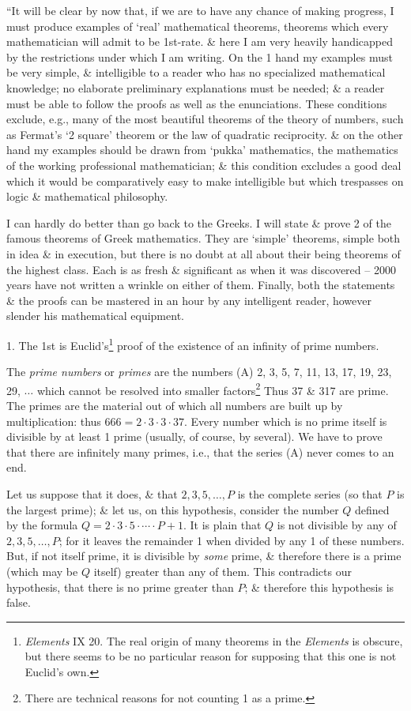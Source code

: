 \documentclass{article}
\numberwithin{equation}{section}
\begin{document}
 ``It will be clear by now that, if we are to have any chance of making progress, I must produce examples of `real' mathematical theorems, theorems which every mathematician will admit to be 1st-rate. \& here I am very heavily handicapped by the restrictions under which I am writing. On the 1 hand my examples must be very simple, \& intelligible to a reader who has no specialized mathematical knowledge; no elaborate preliminary explanations must be needed; \& a reader must be able to follow the proofs as well as the enunciations. These conditions exclude, e.g., many of the most beautiful theorems of the theory of numbers, such as Fermat's `2 square' theorem or the law of quadratic reciprocity. \& on the other hand my examples should be drawn from `pukka' mathematics, the mathematics of the working professional mathematician; \& this condition excludes a good deal which it would be comparatively easy to make intelligible but which trespasses on logic \& mathematical philosophy.

I can hardly do better than go back to the Greeks. I will state \& prove 2 of the famous theorems of Greek mathematics. They are `simple' theorems, simple both in idea \& in execution, but there is no doubt at all about their being theorems of the highest class. Each is as fresh \& significant as when it was discovered -- 2000 years have not written a wrinkle on either of them. Finally, both the statements \& the proofs can be mastered in an hour by any intelligent reader, however slender his mathematical equipment.

1. The 1st is Euclid's\footnote{\textit{Elements} IX 20. The real origin of many theorems in the \textit{Elements} is obscure, but there seems to be no particular reason for supposing that this one is not Euclid's own.} proof of the existence of an infinity of prime numbers.

The \textit{prime numbers} or \textit{primes} are the numbers (A) 2, 3, 5, 7, 11, 13, 17, 19, 23, 29, $\ldots$ which cannot be resolved into smaller factors\footnote{There are technical reasons for not counting 1 as a prime.} Thus 37 \& 317 are prime. The primes are the material out of which all numbers are built up by multiplication: thus $666 = 2\cdot3\cdot3\cdot37$. Every number which is no prime itself is divisible by at least 1 prime (usually, of course, by several). We have to prove that there are infinitely many primes, i.e., that the series (A) never comes to an end.

Let us suppose that it does, \& that $2,3,5,\ldots,P$ is the complete series (so that $P$ is the largest prime); \& let us, on this hypothesis, consider the number $Q$ defined by the formula $Q = 2\cdot3\cdot5\cdot\cdots\cdot P + 1$. It is plain that $Q$ is not divisible by any of $2,3,5,\ldots,P$; for it leaves the remainder 1 when divided by any 1 of these numbers. But, if not itself prime, it is divisible by \textit{some} prime, \& therefore there is a prime (which may be $Q$ itself) greater than any of them. This contradicts our hypothesis, that there is no prime greater than $P$; \& therefore this hypothesis is false.
\end{document}
